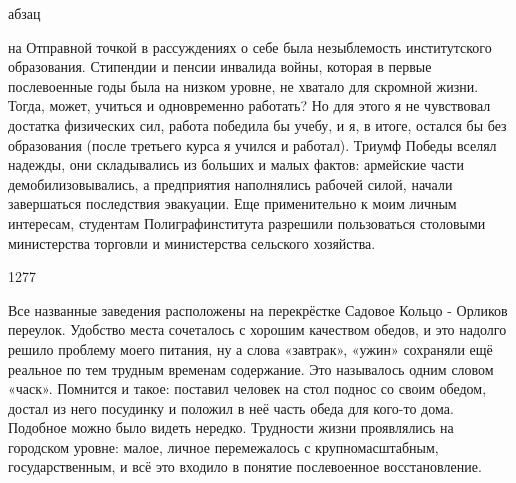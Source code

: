 абзац

на Отправной точкой в рассуждениях о себе была незыблемость институтского образования. Стипендии и пенсии инвалида войны, которая в первые послевоенные годы была на низком уровне, не хватало для скромной жизни. Тогда, может, учиться и одновременно работать? Но для этого я не чувствовал достатка физических сил, работа победила бы учебу, и я, в итоге, остался бы без образования (после третьего курса я учился и работал). Триумф Победы вселял надежды, они складывались из больших и малых фактов: армейские части демобилизовывались, а предприятия наполнялись рабочей силой, начали завершаться последствия эвакуации. Еще применительно к моим личным интересам, студентам Полиграфинститута разрешили пользоваться столовыми министерства торговли и министерства сельского хозяйства.

1277

Все названные заведения расположены на перекрёстке Садовое Кольцо - Орликов переулок. Удобство места сочеталось с хорошим качеством обедов, и это надолго решило проблему моего питания, ну а слова «завтрак», «ужин» сохраняли ещё реальное по тем трудным временам содержание. Это называлось одним словом «часк». Помнится и такое: поставил человек на стол поднос со своим обедом, достал из него посудинку и положил в неё часть обеда для кого-то дома. Подобное можно было видеть нередко. Трудности жизни проявлялись на городском уровне: малое, личное перемежалось с крупномасштабным, государственным, и всё это входило в понятие послевоенное восстановление.
